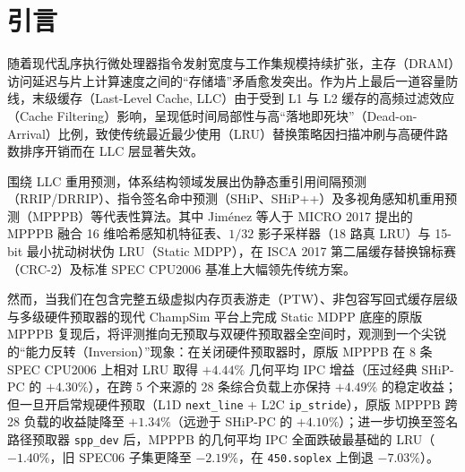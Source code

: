 \documentclass[10.5pt,compsoc,UTF8]{CjC}
\newcommand{\upcite}[1]{\cite{#1}}
\begin{document}
\pagestyle{CjCheadings}
\thispagestyle{empty}

\clearpage
\section{引\quad 言}

随着现代乱序执行微处理器指令发射宽度与工作集规模持续扩张，主存（DRAM）访问延迟与片上计算速度之间的“存储墙”矛盾愈发突出。作为片上最后一道容量防线，末级缓存（Last-Level Cache, LLC）由于受到 L1 与 L2 缓存的高频过滤效应（Cache Filtering）影响，呈现低时间局部性与高“落地即死块”（Dead-on-Arrival）比例\upcite{jaleel2010rrip}，致使传统最近最少使用（LRU）替换策略因扫描冲刷与高硬件路数排序开销而在 LLC 层显著失效。

围绕 LLC 重用预测，体系结构领域发展出伪静态重引用间隔预测（RRIP/DRRIP\upcite{qureshi2007dip,jaleel2010rrip}）、指令签名命中预测（SHiP\upcite{wu2011ship}、SHiP++\upcite{young2017shippp}）及多视角感知机重用预测（MPPPB\upcite{jimenez2017mpppb}）等代表性算法。其中 Jiménez 等人于 MICRO 2017 提出的 MPPPB 融合 16 维哈希感知机特征表、$1/32$ 影子采样器（18 路真 LRU）与 15-bit 最小扰动树状伪 LRU（Static MDPP\upcite{teran2016mdpp}），在 ISCA 2017 第二届缓存替换锦标赛（CRC-2）及标准 SPEC CPU2006 基准上大幅领先传统方案\upcite{jimenez2017crc2}。

然而，当我们在包含完整五级虚拟内存页表游走（PTW）、非包容写回式缓存层级与多级硬件预取器的现代 ChampSim 平台\upcite{gober2022champsim}上完成 Static MDPP 底座的原版 MPPPB 复现后，将评测推向无预取与双硬件预取器全空间时，观测到一个尖锐的“能力反转（Inversion）”现象：在关闭硬件预取器时，原版 MPPPB 在 8 条 SPEC CPU2006 上相对 LRU 取得 $+4.44\%$ 几何平均 IPC 增益（压过经典 SHiP-PC 的 $+4.30\%$），在跨 5 个来源的 28 条综合负载上亦保持 $+4.49\%$ 的稳定收益；但一旦开启常规硬件预取（L1D \texttt{next\_line} + L2C \texttt{ip\_stride}），原版 MPPPB 跨 28 负载的收益陡降至 $+1.34\%$（远逊于 SHiP-PC 的 $+4.10\%$）；进一步切换至签名路径预取器 \texttt{spp\_dev}\upcite{kim2016spp} 后，MPPPB 的几何平均 IPC 全面跌破最基础的 LRU（\textbf{$-1.40\%$}，旧 SPEC06 子集更降至 $-2.19\%$，在 \texttt{450.soplex} 上倒退 $-7.03\%$）。
\end{document}
